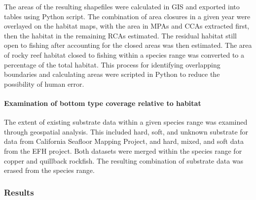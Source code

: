 \documentclass[11pt,
  english,
  a4paper,
]{article}
\begin{document}
\leavevmode\tagmcend\tagstructend\par


The areas of the resulting shapefiles were calculated in GIS and exported into tables using Python script. The combination of area closures in a given year were overlayed on the habitat maps, with the area in MPAs and CCAs extracted first, then the habitat in the remaining RCAs estimated. The residual habitat still open to fishing after accounting for the closed areas was then estimated. The area of rocky reef habitat closed to fishing within a species range was converted to a percentage of the total habitat. This process for identifying overlapping boundaries and calculating areas were scripted in Python to reduce the possibility of human error.

\leavevmode\tagmcend\tagstructend\par


\hypertarget{examination-of-bottom-type-coverage-relative-to-habitat}{%
\paragraph{Examination of bottom type coverage relative to habitat}\label{examination-of-bottom-type-coverage-relative-to-habitat}}

\leavevmode\tagmcend\tagstructend


The extent of existing substrate data within a given species range was examined through geospatial analysis. This included hard, soft, and unknown substrate for data from California Seafloor Mapping Project, and hard, mixed, and soft data from the EFH project. Both datasets were merged within the species range for copper and quillback rockfish. The resulting combination of substrate data was erased from the species range.

\leavevmode\tagmcend\tagstructend\par


\hypertarget{results}{%
\subsubsection{Results}\label{results}}

\leavevmode\tagmcend\tagstructend
\end{document}
